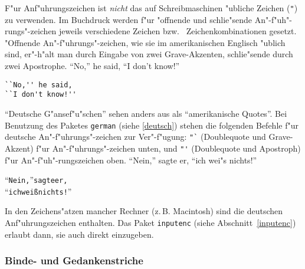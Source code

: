 F"ur Anf"uhrungszeichen ist \emph{nicht} das auf Schreibmaschinen
"ubliche Zeichen (\verb|"|) zu verwenden.
Im Buchdruck werden f"ur "offnende und schlie"sende
An"-f"uh"-rungs"-zeichen jeweils verschiedene Zeichen bzw.\ %
Zeichenkombinationen gesetzt.
"Offnende An"-f"uhrungs"-zeichen, wie sie im amerikanischen Englisch 
"ublich sind, er"-h"alt man durch Eingabe von zwei Grave-Akzenten, 
schlie"sende durch zwei Apostrophe.
\exa
``No,'' he said,
``I don't know!''
\exb
\begin{verbatim}
``No,'' he said,
``I don't know!''
\end{verbatim}
\exc
"`Deutsche G"ansef"u"schen"' sehen anders aus als ``amerikanische
Quotes''.  
Bei Benutzung des Paketes \texttt{german} (siehe \ref{deutsch})
stehen die folgenden Befehle f"ur 
deutsche An"-f"uhrungs"-zeichen zur Ver"-f"ugung:
\verb|"`| (Doublequote und Grave-Akzent) f"ur An"-f"uhrungs"-zeichen
unten,
und
\verb|"'| (Doublequote und Apostroph) f"ur An"-f"uh"-rungszeichen oben.
\exa
"`Nein,"' sagte er,
"`ich wei"s nichts!"'
\exb
\begin{alltt}
"`Nein,"' sagte er,
"`ich wei\ss{} nichts!"'
\end{alltt}
\exc
In den Zeichens"atzen mancher Rechner (z.\,B. Macintosh) sind die deutschen 
Anf"uhrungszeichen enthalten.  Das Paket \texttt{inputenc} (siehe
Abschnitt~\ref{inputenc}) erlaubt dann, sie auch direkt einzugeben.


\subsubsection{Binde- und Gedankenstriche}
 
